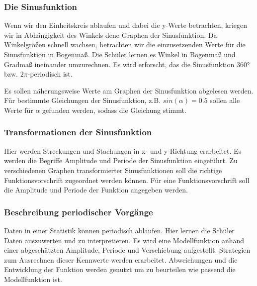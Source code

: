 \documentclass{article}
\begin{document}
\subsubsection*{Die Sinusfunktion}
Wenn wir den Einheitskreis ablaufen und dabei die y-Werte betrachten, kriegen wir in Abhängigkeit des Winkels dene Graphen der Sinusfunktion.
Da Winkelgrößen schnell wachsen, betrachten wir die einzusetzenden Werte für die Sinusfunktion in Bogenmaß.
Die Schüler lernen es Winkel in Bogenmaß und Gradmaß ineinander umzurechnen.
Es wird erforscht, das die Sinusfunktion $360°$ bzw. $2\pi$-periodisch ist.

Es sollen näherungsweise Werte am Graphen der Sinusfunktion abgelesen werden.
Für bestimmte Gleichungen der Sinusfunktion, z.B. $sin(\alpha) = 0.5$ sollen alle Werte für $\alpha$ gefunden werden, sodass die Gleichung stimmt.
\subsubsection*{Transformationen der Sinusfunktion}
Hier werden Streckungen und Stachungen in x- und y-Richtung erarbeitet.
Es werden die Begriffe Amplitude und Periode der Sinusfunktion eingeführt.
Zu verschiedenen Graphen transformierter Sinusfunktionen soll die richtige Funktionsvorschrift zugeordnet werden können.
Für eine Funktionsvorschrift soll die Amplitude und Periode der Funktion angegeben werden.
\subsubsection*{Beschreibung periodischer Vorgänge}
Daten in einer Statistik können periodisch ablaufen.
Hier lernen die Schüler Daten auszuwerten und zu interpretieren.
Es wird eine Modellfunktion anhand einer abgeschätzten Amplitude, Periode und Verschiebung aufgestellt.
Strategien zum Ausrechnen dieser Kennwerte werden erarbeitet.
Abweichungen und die Entwicklung der Funktion werden genutzt um zu beurteilen wie passend die Modellfunktion ist.
\end{document}

